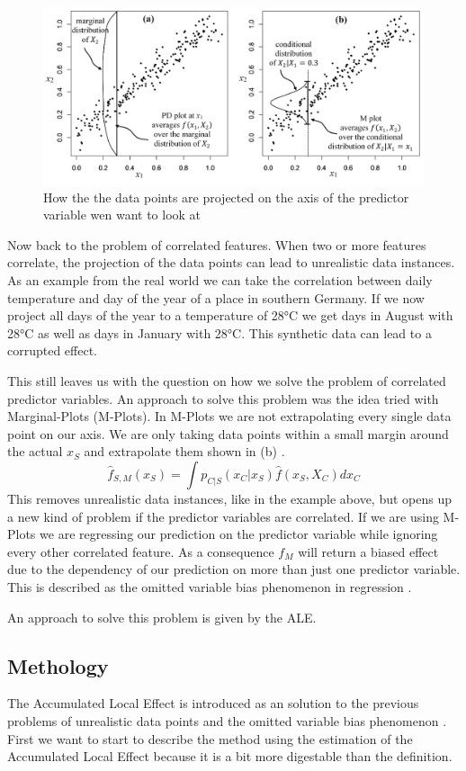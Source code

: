 \documentclass[11pt,
  a4paper,
  parskip=half, %
  BCOR=10mm, %
  english,
  ]{article}
\begin{document}
\begin{figure}
    \centering
    \includegraphics[width=0.7\linewidth]{images/PD_and_M.png}
    \caption{How the the data points are projected on the axis of the predictor variable wen want to look at}
    \label{fig:PD_M}
\end{figure}

Now back to the problem of correlated features. When two or more features correlate, the projection of the 
data points can lead to unrealistic data instances. As an example from the real world we can take the correlation 
between daily temperature and day of the year of a place in southern Germany. If we now project all days of the year
to a temperature of 28°C we get days in August with 28°C as well as days in January with 28°C. This synthetic data can 
lead to a corrupted effect.

This still leaves us with the question on how we solve the problem of correlated predictor variables. 
An approach to solve this problem was the idea tried with Marginal-Plots (M-Plots). In M-Plots we are not extrapolating 
every single data point on our axis. We are only taking data points within a small margin around the actual $x_S$ and extrapolate them shown in  (b) \cite{ALE-paper}.
\begin{equation}
    \hat{f}_{S, M}(x_S) = \int p_{C|S}(x_C | x_S) \hat{f}(x_S, X_C) d x_C
\end{equation}
This removes unrealistic data instances, like in the example above, but opens up a new kind of problem if the predictor variables are correlated. If we are using M-Plots we are regressing our prediction on the predictor variable while ignoring every other correlated feature. As a consequence $f_M$ will return a biased effect due to the dependency of our prediction on more than just one predictor variable. This is described as the omitted variable bias phenomenon in regression \cite{ALE-paper}. 

An approach to solve this problem is given by the ALE. 


\subsection{Methology} \label{section:methology}
The Accumulated Local Effect is introduced as an solution to the previous problems of unrealistic data points and the omitted variable bias phenomenon \cite{ALE-paper}. 
First we want to start to describe the method using the estimation of the Accumulated Local Effect because it is a bit more digestable than the definition. 
\end{document}
